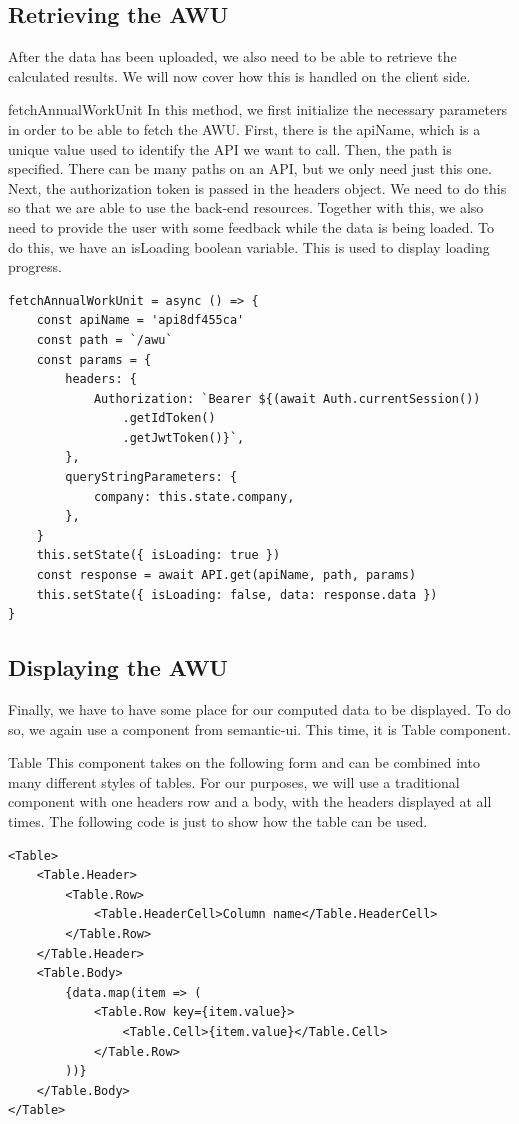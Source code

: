 \documentclass[12pt,oneside]{fithesis2}
\begin{document}
\subsection{Retrieving the AWU}
After the data has been uploaded, we also need to be able to retrieve the calculated results. We will now cover how this is handled on the client side.

fetchAnnualWorkUnit In this method, we first initialize the necessary parameters in order to be able to fetch the AWU. First, there is the apiName, which is a unique value used to identify the API we want to call. Then, the path is specified. There can be many paths on an API, but we only need just this one. Next, the authorization token is passed in the headers object. We need to do this so that we are able to use the back-end resources. Together with this, we also need to provide the user with some feedback while the data is being loaded. To do this, we have an isLoading boolean variable. This is used to display loading progress.

\begin{lstlisting}[style=htmlcssjs]
fetchAnnualWorkUnit = async () => {
	const apiName = 'api8df455ca'
	const path = `/awu`
	const params = {
		headers: {
			Authorization: `Bearer ${(await Auth.currentSession())
				.getIdToken()
				.getJwtToken()}`,
		},
		queryStringParameters: {
			company: this.state.company,
		},
	}
	this.setState({ isLoading: true })
	const response = await API.get(apiName, path, params)
	this.setState({ isLoading: false, data: response.data })
}
\end{lstlisting}


\subsection{Displaying the AWU}
Finally, we have to have some place for our computed data to be displayed. To do so, we again use a component from semantic-ui. This time, it is Table component.

Table This component takes on the following form and can be combined into many different styles of tables. For our purposes, we will use a traditional component with one headers row and a body, with the headers displayed at all times. The following code is just to show how the table can be used.

\begin{lstlisting}[style=htmlcssjs]
<Table>
	<Table.Header>
		<Table.Row>
			<Table.HeaderCell>Column name</Table.HeaderCell>
		</Table.Row>
	</Table.Header>
	<Table.Body>
		{data.map(item => (
			<Table.Row key={item.value}>
				<Table.Cell>{item.value}</Table.Cell>
			</Table.Row>
		))}
	</Table.Body>
</Table>
\end{lstlisting}
\end{document}
